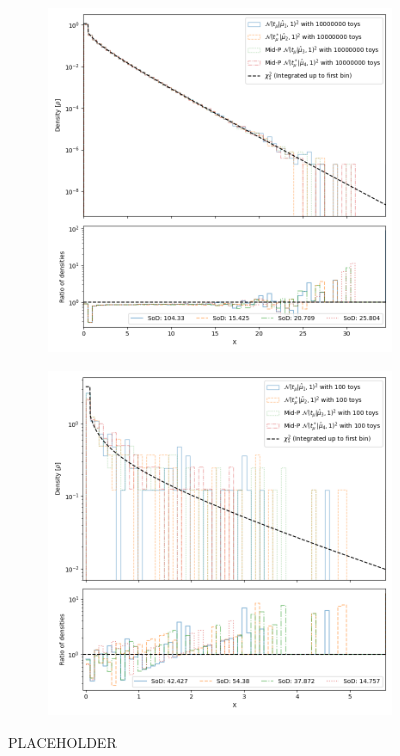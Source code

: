 \documentclass[14pt, a4paper]{article}  %
\begin{document}
\begin{figure}[!ht]
	\centering
	\begin{subfigure}[b]{0.49\textwidth}
        \centering
        \includegraphics[width=1\textwidth]{CLT_diff_MLE/chi2_book_with_10000000_toys.png}
     \end{subfigure}
     \hfill
     \begin{subfigure}[b]{0.49\textwidth}
        \centering
        \includegraphics[width=1\textwidth]{CLT_diff_MLE/chi2_book_with_100_toys.png}
     \end{subfigure}
	\caption{PLACEHOLDER}\label{fig:CLT}
 \end{figure}
\end{document}
